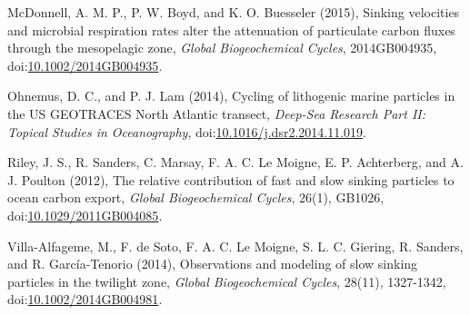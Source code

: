 \begin{singlespace}
{{McDonnell, A. M. P., P. W. Boyd, and K. O. Buesseler (2015), Sinking velocities and microbial respiration rates alter the attenuation of particulate carbon fluxes through the mesopelagic zone, \emph{Global Biogeochemical Cycles}, 2014GB004935, doi:\href{http://dx.doi.org/10.1002/2014GB004935}{10.1002/2014GB004935}.

Ohnemus, D. C., and P. J. Lam (2014), Cycling of lithogenic marine particles in the US GEOTRACES North Atlantic transect, \emph{Deep-Sea Research Part II: Topical Studies in Oceanography}, doi:\href{http://dx.doi.org/10.1016/j.dsr2.2014.11.019}{10.1016/j.dsr2.2014.11.019}.

Riley, J. S., R. Sanders, C. Marsay, F. A. C. Le Moigne, E. P. Achterberg, and A. J. Poulton (2012), The relative contribution of fast and slow sinking particles to ocean carbon export, \emph{Global Biogeochemical Cycles}, 26(1), GB1026, doi:\href{http://dx.doi.org/10.1029/2011GB004085}{10.1029/2011GB004085}.

Villa-Alfageme, M., F. de Soto, F. A. C. Le Moigne, S. L. C. Giering, R. Sanders, and R. Garc\'{i}a-Tenorio (2014), Observations and modeling of slow sinking particles in the twilight zone, \emph{Global Biogeochemical Cycles}, 28(11), 1327-1342, doi:\href{http://dx.doi.org/10.1002/2014GB004981}{10.1002/2014GB004981}.}}
\end{singlespace}